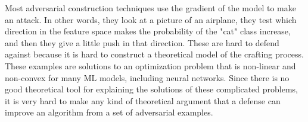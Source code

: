 Most adversarial construction techniques use the gradient of the model to make an attack. In other words, they look at a picture of an airplane, they test which direction in the feature space makes the probability of the "cat" class increase, and then they give a little push in that direction. These are hard to defend against because it is hard to construct a theoretical model of the crafting process. These examples are solutions to an optimization problem that is non-linear and non-convex for many ML models, including neural networks. Since there is no good theoretical tool for explaining the solutions of these complicated problems, it is very hard to make any kind of theoretical argument that a defense can improve an algorithm from a set of adversarial examples.